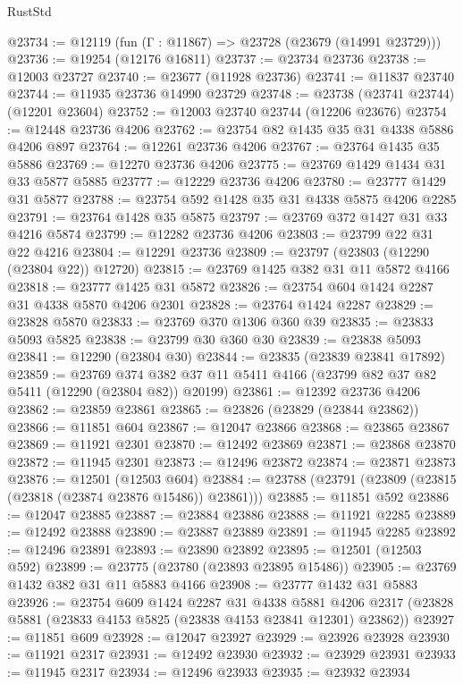 \begin{lexlean}{RustStd}
\begin{coremodule}
@23734 := @12119 (fun (Γ : @11867) => @23728 (@23679 (@14991 @23729)))
@23736 := @19254 (@12176 @16811)
@23737 := @23734 @23736
@23738 := @12003 @23727
@23740 := @23677 (@11928 @23736)
@23741 := @11837 @23740
@23744 := @11935 @23736 @14990 @23729
@23748 := @23738 (@23741 @23744) (@12201 @23604)
@23752 := @12003 @23740 @23744 (@12206 @23676)
@23754 := @12448 @23736 @4206
@23762 := @23754 @82 @1435 @35 @31 @4338 @5886 @4206 @897
@23764 := @12261 @23736 @4206
@23767 := @23764 @1435 @35 @5886
@23769 := @12270 @23736 @4206
@23775 := @23769 @1429 @1434 @31 @33 @5877 @5885
@23777 := @12229 @23736 @4206
@23780 := @23777 @1429 @31 @5877
@23788 := @23754 @592 @1428 @35 @31 @4338 @5875 @4206 @2285
@23791 := @23764 @1428 @35 @5875
@23797 := @23769 @372 @1427 @31 @33 @4216 @5874
@23799 := @12282 @23736 @4206
@23803 := @23799 @22 @31 @22 @4216
@23804 := @12291 @23736
@23809 := @23797 (@23803 (@12290 (@23804 @22)) @12720)
@23815 := @23769 @1425 @382 @31 @11 @5872 @4166
@23818 := @23777 @1425 @31 @5872
@23826 := @23754 @604 @1424 @2287 @31 @4338 @5870 @4206 @2301
@23828 := @23764 @1424 @2287
@23829 := @23828 @5870
@23833 := @23769 @370 @1306 @360 @39
@23835 := @23833 @5093 @5825
@23838 := @23799 @30 @360 @30
@23839 := @23838 @5093
@23841 := @12290 (@23804 @30)
@23844 := @23835 (@23839 @23841 @17892)
@23859 := @23769
    @374
    @382
    @37
    @11
    @5411
    @4166
    (@23799 @82 @37 @82 @5411 (@12290 (@23804 @82)) @20199)
@23861 := @12392 @23736 @4206
@23862 := @23859 @23861
@23865 := @23826 (@23829 (@23844 @23862))
@23866 := @11851 @604
@23867 := @12047 @23866
@23868 := @23865 @23867
@23869 := @11921 @2301
@23870 := @12492 @23869
@23871 := @23868 @23870
@23872 := @11945 @2301
@23873 := @12496 @23872
@23874 := @23871 @23873
@23876 := @12501 (@12503 @604)
@23884 := @23788 (@23791 (@23809 (@23815 (@23818 (@23874 @23876 @15486)) @23861)))
@23885 := @11851 @592
@23886 := @12047 @23885
@23887 := @23884 @23886
@23888 := @11921 @2285
@23889 := @12492 @23888
@23890 := @23887 @23889
@23891 := @11945 @2285
@23892 := @12496 @23891
@23893 := @23890 @23892
@23895 := @12501 (@12503 @592)
@23899 := @23775 (@23780 (@23893 @23895 @15486))
@23905 := @23769 @1432 @382 @31 @11 @5883 @4166
@23908 := @23777 @1432 @31 @5883
@23926 := @23754
    @609
    @1424
    @2287
    @31
    @4338
    @5881
    @4206
    @2317
    (@23828 @5881 (@23833 @4153 @5825 (@23838 @4153 @23841 @12301) @23862))
@23927 := @11851 @609
@23928 := @12047 @23927
@23929 := @23926 @23928
@23930 := @11921 @2317
@23931 := @12492 @23930
@23932 := @23929 @23931
@23933 := @11945 @2317
@23934 := @12496 @23933
@23935 := @23932 @23934

\end{coremodule}
\end{lexlean}
